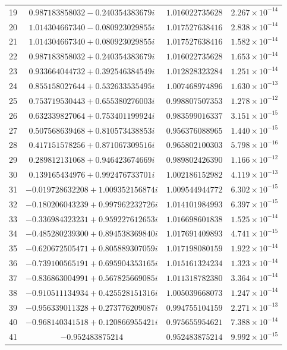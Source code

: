 \documentclass[a4paper,11pt]{article}
\begin{document}
\begin{longtable}{rccc}
19 & $0.987183858032-0.240354383679i$ & $1.016022735628$ & $2.267\times10^{-14}$ \\
20 & $1.014304667340-0.080923029855i$ & $1.017527638416$ & $2.838\times10^{-14}$ \\
21 & $1.014304667340+0.080923029855i$ & $1.017527638416$ & $1.582\times10^{-14}$ \\
22 & $0.987183858032+0.240354383679i$ & $1.016022735628$ & $1.653\times10^{-14}$ \\
23 & $0.933664044732+0.392546384549i$ & $1.012828323284$ & $1.251\times10^{-14}$ \\
24 & $0.855158027644+0.532633535495i$ & $1.007468974896$ & $1.630\times10^{-13}$ \\
25 & $0.753719530443+0.655380276003i$ & $0.998807507353$ & $1.278\times10^{-12}$ \\
26 & $0.632339827064+0.753401199924i$ & $0.983599016337$ & $3.151\times10^{-15}$ \\
27 & $0.507568639468+0.810573438853i$ & $0.956376088965$ & $1.440\times10^{-15}$ \\
28 & $0.417151578256+0.871067309516i$ & $0.965802100303$ & $5.798\times10^{-16}$ \\
29 & $0.289812131068+0.946423674669i$ & $0.989802426390$ & $1.166\times10^{-12}$ \\
30 & $0.139165434976+0.992476733701i$ & $1.002186152982$ & $4.119\times10^{-13}$ \\
31 & $-0.019728632208+1.009352156874i$ & $1.009544944772$ & $6.302\times10^{-15}$ \\
32 & $-0.180206043239+0.997962232726i$ & $1.014101984993$ & $6.397\times10^{-15}$ \\
33 & $-0.336984323231+0.959227612653i$ & $1.016698601838$ & $1.525\times10^{-14}$ \\
34 & $-0.485280239300+0.894538369840i$ & $1.017691409893$ & $4.741\times10^{-15}$ \\
35 & $-0.620672505471+0.805889307059i$ & $1.017198080159$ & $1.922\times10^{-14}$ \\
36 & $-0.739100565191+0.695904353165i$ & $1.015161324234$ & $1.323\times10^{-14}$ \\
37 & $-0.836863004991+0.567825669085i$ & $1.011318782380$ & $3.364\times10^{-14}$ \\
38 & $-0.910511134934+0.425528151316i$ & $1.005039668073$ & $1.247\times10^{-14}$ \\
39 & $-0.956339011328+0.273776209087i$ & $0.994755104159$ & $2.271\times10^{-13}$ \\
40 & $-0.968140341518+0.120866955421i$ & $0.975655954621$ & $7.388\times10^{-14}$ \\
41 & $-0.952483875214$ & $0.952483875214$ & $9.992\times10^{-15}$ \\
\bottomrule
\end{longtable}
\end{document}

